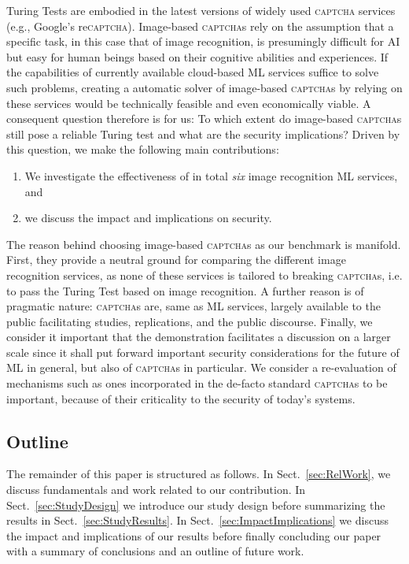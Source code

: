 \documentclass[sigconf,review,anonymous]{acmart}
\newcommand{\captcha}{\textsc{captcha}\xspace}
\newcommand{\captchas}{\textsc{captcha}s\xspace}
\begin{document}
Turing Tests are embodied in the latest versions of widely used \captcha services (e.g., Google's re\captcha). Image-based \captchas rely on the assumption that a specific task, in this case that of image recognition, is presumingly difficult for AI but easy for human beings based on their cognitive abilities and experiences. If the capabilities of currently available cloud-based ML services suffice to solve such problems, creating a automatic solver of image-based \captchas by relying on these services would be technically feasible and even economically viable. A consequent question therefore is for us: To which extent do image-based \captchas still pose a reliable Turing test and what are the security implications? Driven by this question, we make the following main contributions:

\begin{enumerate}
\item We investigate the effectiveness of in total \emph{six} image recognition ML services, and
\item we discuss the impact and implications on security.
\end{enumerate}

The reason behind choosing image-based \captchas as our benchmark is manifold. First, they provide a neutral ground for comparing the different image recognition services, as none of these services is tailored to breaking \captchas, i.e. to pass the Turing Test based on image recognition. A further reason is of pragmatic nature: \captchas are, same as ML services, largely available to the public facilitating studies, replications, and the public discourse.
Finally, we consider it important that the demonstration facilitates a discussion on a larger scale since it shall put forward important security considerations for the future of ML in general, but also of \captchas in particular. We consider a re-evaluation of mechanisms such as ones incorporated in the de-facto standard \captchas to be important, because of their criticality to the security of today's systems.

\subsection{Outline}

The remainder of this paper is structured as follows. In Sect.~\ref{sec:RelWork}, we discuss fundamentals and work related to our contribution. In Sect.~\ref{sec:StudyDesign} we introduce our study design before summarizing the results in Sect.~\ref{sec:StudyResults}. In Sect.~\ref{sec:ImpactImplications} we discuss the impact and implications of our results before finally concluding our paper with a summary of conclusions and an outline of future work.
\end{document}
